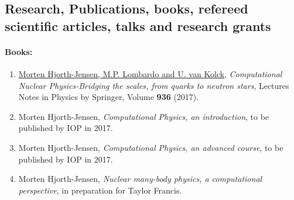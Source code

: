 \documentclass[a4wide,10pt]{article}
\begin{document}
\subsection*{Research, Publications, books, refereed scientific articles, talks and research grants}

\paragraph{Books:}
\begin{enumerate}
\item \href{{http://www.springer.com/us/book/9783319533353}}{Morten Hjorth-Jensen, M.P. Lombardo and U. van Kolck}, \emph{Computational Nuclear Physics-Bridging the scales, from quarks to neutron stars}, Lectures Notes in Physics by Springer, Volume \textbf{936} (2017).

\item Morten Hjorth-Jensen, \emph{Computational Physics, an introduction}, to be published by IOP in 2017.

\item Morten Hjorth-Jensen, \emph{Computational Physics, an advanced course}, to be published by IOP in 2017.

\item Morten Hjorth-Jensen, \emph{Nuclear many-body physics, a computational perspective}, in preparation for Taylor Francis.


\end{enumerate}

\end{document}
